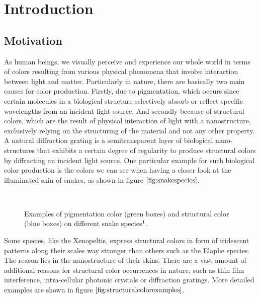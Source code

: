 \chapter{Introduction}
\section{Motivation}
As human beings, we visually perceive and experience our whole world in terms of colors resulting from various physical phenomena that involve interaction between light and matter. Particularly in nature, there are basically two main causes for color production. Firstly, due to pigmentation, which occurs since certain molecules in a biological structure selectively absorb or reflect specific wavelengths from an incident light source. And secondly because of structural colors, which are the result of physical interaction of light with a nanostructure, exclusively relying on the structuring of the material and not any other property. A natural diffraction grating is a semitransparent layer of biological nano-structures that exhibits a certain degree of regularity to produce structural colors by diffracting an incident light source. One particular example for such biological color production is the colors we can see when having a closer look at the illuminated skin of snakes, as shown in figure $\ref{fig:snakespecies}$.

\begin{figure}[H]
  \centering
~
  \caption[Example of Biological Color Production]{Examples of pigmentation color (green boxes) and structural color (blue boxes) on different snake species$\footnotemark$.}
  \label{fig:snakespecies}
\end{figure}

Some species, like the Xenopeltis, express structural colors in form of iridescent patterns along their scales way stronger than others such as the Elaphe species. The reason lies in the nanostructure of their skins. There are a vast amount of additional reasons for structural color occurrences in nature, such as thin film interference, intra-cellular photonic crystals or diffraction gratings. More detailed examples are shown in figure $\ref{fig:structuralcolorexamples}$. 

